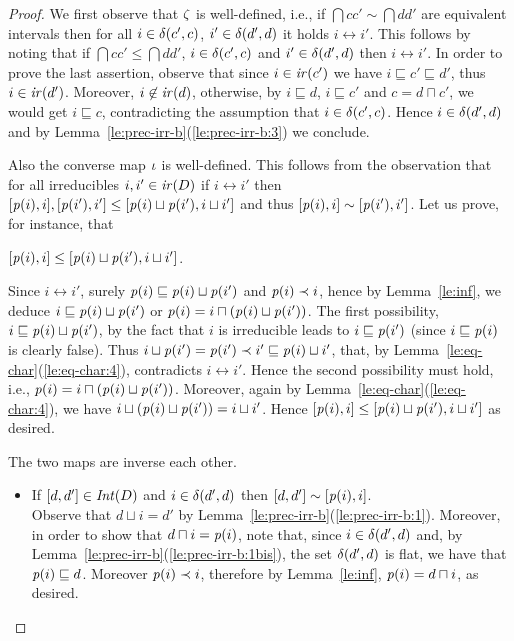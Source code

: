 \begin{proof}
  We first observe that $\mathop{\mathit{\zeta}}$ is well-defined, i.e., if
  $\dint{c}{c'} \sim \dint{d}{d'}$ are equivalent intervals then for
  all $i \in \delta({c'},{c})$, $i' \in \delta({d'},{d})$ it holds
  $i \leftrightarrow i'$. This follows by noting that if
  $\dint{c}{c'} \leq \dint{d}{d'}$, $i \in \delta({c'},{c})$ and
  $i' \in \delta({d'},{d})$ then $i \leftrightarrow i'$.
  In order to prove the last assertion, observe that since
  $i \in \mathop{\mathit{ir}({c'})}$ we have $i \sqsubseteq c' \sqsubseteq d'$, thus
  $i \in \mathop{\mathit{ir}({d'})}$.  Moreover, $i \not\in \mathop{\mathit{ir}({d})}$, otherwise, by
  $i \sqsubseteq d$, $i \sqsubseteq c'$ and $c = d \sqcap c'$, we
  would get $i \sqsubseteq c$, contradicting the assumption that
  $i \in \delta({c'},{c})$. Hence $i \in \delta({d'},{d})$ and by
  Lemma~\ref{le:prec-irr-b}(\ref{le:prec-irr-b:3}) we conclude.

  Also the converse map $\mathop{\mathit{\iota}}$ is well-defined. This follows from the
  observation that for all irreducibles $i, i' \in \mathop{\mathit{ir}({D})}$ if
  $i \leftrightarrow i'$ then
  $[{\mathit{p}({i})},{i}], [{\mathit{p}({i'})},{i'}] \leq [{\mathit{p}({i}) \sqcup
    \mathit{p}({i'})},{i \sqcup i'}]$ and thus
  $[{\mathit{p}({i})},{i}] \sim [{\mathit{p}({i'})},{i'}]$. Let us prove, for
  instance, that
  \begin{center}
    $[{\mathit{p}({i})},{i}] \leq [{\mathit{p}({i}) \sqcup \mathit{p}({i'})},{i \sqcup
      i'}]$.
  \end{center}
  Since $i \leftrightarrow i'$, surely
  $\mathit{p}({i}) \sqsubseteq \mathit{p}({i}) \sqcup \mathit{p}({i'})$ and
  $\mathit{p}({i}) \prec i$, hence by Lemma~\ref{le:inf}, we deduce
  $i \sqsubseteq \mathit{p}({i}) \sqcup \mathit{p}({i'})$ or
  $\mathit{p}({i}) = i \sqcap (\mathit{p}({i}) \sqcup \mathit{p}({i'}))$. The first
  possibility, $i \sqsubseteq \mathit{p}({i}) \sqcup \mathit{p}({i'})$, by the fact
  that $i$ is irreducible leads to $i \sqsubseteq \mathit{p}({i'})$ (since
  $i \sqsubseteq \mathit{p}({i})$ is clearly false). Thus
  $i \sqcup \mathit{p}({i'}) = \mathit{p}({i'}) \prec i' \sqsubseteq \mathit{p}({i}) \sqcup
  i'$, that, by Lemma~\ref{le:eq-char}(\ref{le:eq-char:4}),
  contradicts $i \leftrightarrow i'$.
  Hence the second possibility must hold, i.e.,
  $\mathit{p}({i}) = i \sqcap (\mathit{p}({i}) \sqcup \mathit{p}({i'}))$. Moreover, again
  by Lemma~\ref{le:eq-char}(\ref{le:eq-char:4}), we have
  $i \sqcup (\mathit{p}({i}) \sqcup \mathit{p}({i'})) = i \sqcup i'$. Hence
  $[{\mathit{p}({i})},{i}] \leq [{\mathit{p}({i}) \sqcup \mathit{p}({i'})},{i \sqcup
    i'}]$ as desired.
  

  \bigskip
  
  The two maps are inverse each other.
  \begin{itemize}
  \item If $[{d},{d'}] \in \mathop{\mathit{Int}({D})}$ and $i \in \delta({d'},{d})$ then
    $[{d},{d'}] \sim [{\mathit{p}({i})},{i}]$.\\
    Observe that $d \sqcup i = d'$ by
    Lemma~\ref{le:prec-irr-b}(\ref{le:prec-irr-b:1}). Moreover, in
    order to show that $d \sqcap i = \mathit{p}({i})$, note that, since
    $i \in \delta({d'},{d})$ and, by
    Lemma~\ref{le:prec-irr-b}(\ref{le:prec-irr-b:1bis}), the set
    $\delta({d'},{d})$ is flat, we have that $\mathit{p}({i}) \sqsubseteq d$.
    Moreover $\mathit{p}({i}) \prec i$, therefore by Lemma~\ref{le:inf},
    $\mathit{p}({i}) = d \sqcap i$, as desired.
    

\end{itemize}
\end{proof}
